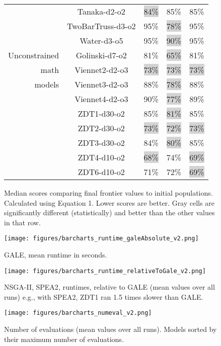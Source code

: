 \documentclass[10pt,journal,cspaper,compsoc]{IEEEtran}
\begin{document}
\begin{figure}
\begin{tabular}{|r|c|c|c|c|}
	&	Tanaka-d2-o2	&	\colorbox{lightgray}{84\%}	&	85\%	&	85\%	\\
	&	TwoBarTruss-d3-o2	&	95\%	&	\colorbox{lightgray}{78\%}	&	95\%	\\
	&	Water-d3-o5	&	95\%	&	\colorbox{lightgray}{90\%}	&	95\%	\\ \hline
Unconstrained	&	Golinski-d7-o2	&	81\%	&	\colorbox{lightgray}{65\%}	&	81\%	\\
math	&	Viennet2-d2-o3	&	\colorbox{lightgray}{73\%}	&	\colorbox{lightgray}{73\%}	&	\colorbox{lightgray}{73\%}	\\
models	&	Viennet3-d2-o3	&	88\%	&	\colorbox{lightgray}{78\%}	&	88\%	\\
	&	Viennet4-d2-o3	&	90\%	&	\colorbox{lightgray}{77\%}	&	89\%	\\
	&	ZDT1-d30-o2	&	85\%	&	\colorbox{lightgray}{81\%}	&	85\%	\\
	&	ZDT2-d30-o2	&	\colorbox{lightgray}{73\%}	&	\colorbox{lightgray}{72\%}	&	\colorbox{lightgray}{73\%}	\\
	&	ZDT3-d30-o2	&	84\%	&	\colorbox{lightgray}{80\%}	&	85\%	\\
	&	ZDT4-d10-o2	&	\colorbox{lightgray}{68\%}	&	74\%	&	\colorbox{lightgray}{69\%}	\\
	&	ZDT6-d10-o2	&	71\%	&	72\%	&	\colorbox{lightgray}{69\%}	\\ \hline
\end{tabular}
\caption{Median scores comparing final frontier values to
initial populations. Calculated using Equation 1. Lower
scores are better. Gray cells are significantly different
(statistically) and better than the other values in that row.}
\label{whateveryouwannacallme}
\end{figure}



\begin{figure}[!t]
\centering
\texttt{[image: figures/barcharts\_runtime\_galeAbsolute\_v2.png]}
\caption{GALE, mean runtime in seconds.}\label{fig:runGale} 
\end{figure}

\begin{figure}[!t]
\texttt{[image: figures/barcharts\_runtime\_relativeToGale\_v2.png]}
\caption{NSGA-II, SPEA2, runtimes, relative to GALE (mean values
over all runs) e.g., with SPEA2, ZDT1 ran 1.5 times slower than GALE.}\label{fig:runSpea2} 
\end{figure}

\begin{figure}[!b]
\texttt{[image: figures/barcharts\_numeval\_v2.png]}
\caption{Number of evaluations (mean values over all runs). Models sorted
by their maximum number of evaluations.}\label{fig:evals} 
\end{figure}







\end{document}
